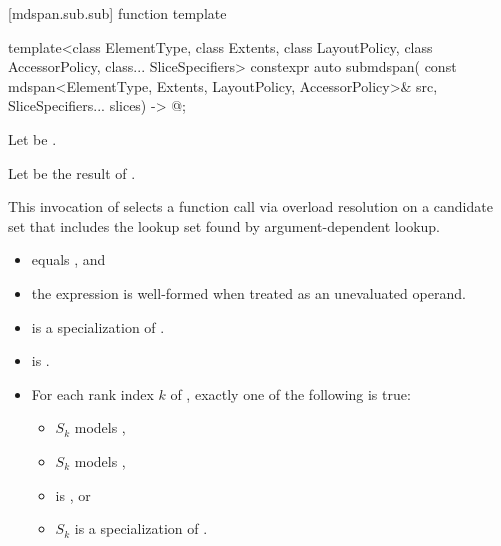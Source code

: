 [mdspan.sub.sub]{ function template}

%
\begin{itemdecl}
template<class ElementType, class Extents, class LayoutPolicy,
         class AccessorPolicy, class... SliceSpecifiers>
  constexpr auto submdspan(
    const mdspan<ElementType, Extents, LayoutPolicy, AccessorPolicy>& src,
    SliceSpecifiers... slices) -> @\seebelow@;
\end{itemdecl}

\begin{itemdescr}
\pnum
Let  be .

\pnum
Let  be the result of
.
\begin{note}
This invocation of 
selects a function call via overload resolution
on a candidate set that includes the lookup set
found by argument-dependent lookup.
\end{note}

\pnum
\constraints
\begin{itemize}
\item
{} equals , and
\item
the expression 
is well-formed when treated as an unevaluated operand.
\end{itemize}

\pnum
\mandates
\begin{itemize}
\item
{}
is a specialization of .

\item
{}
is .

\item
For each rank index $k$ of ,
exactly one of the following is true:
  \begin{itemize}
  \item $S_k$ models ,
  \item $S_k$ models ,
  \item {} is , or
  \item $S_k$ is a specialization of .
  \end{itemize}
\end{itemize}


\end{itemdescr}

